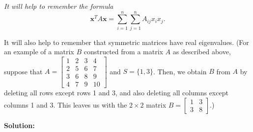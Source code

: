 \documentclass{article}
\begin{document}
\textit{It will help to remember the formula}
\[\mathbf{x}^T A\mathbf{x} = \sum_{i=1}^n \sum_{j=1}^n A_{ij}x_ix_j.\]

It will also help to remember that symmetric matrices have real eigenvalues.
(For an example of a matrix $B$ constructed from a matrix $A$ as described above,
suppose that $A = \begin{bmatrix}
1 & 2 & 3 & 4 \\
2 & 5 & 6 & 7 \\
3 & 6 & 8 & 9 \\
4 & 7 & 9 & 10
\end{bmatrix}$ and $S = \{1,3\}$. Then, we obtain $B$ from $A$
by deleting all rows except rows 1 and 3, and also deleting all columns except columns 1 and 3. This leaves us with the $2 \times 2$ matrix $B = \begin{bmatrix}
1 & 3 \\
3 & 8
\end{bmatrix}$.)

\textbf{Solution:}
\end{document}
